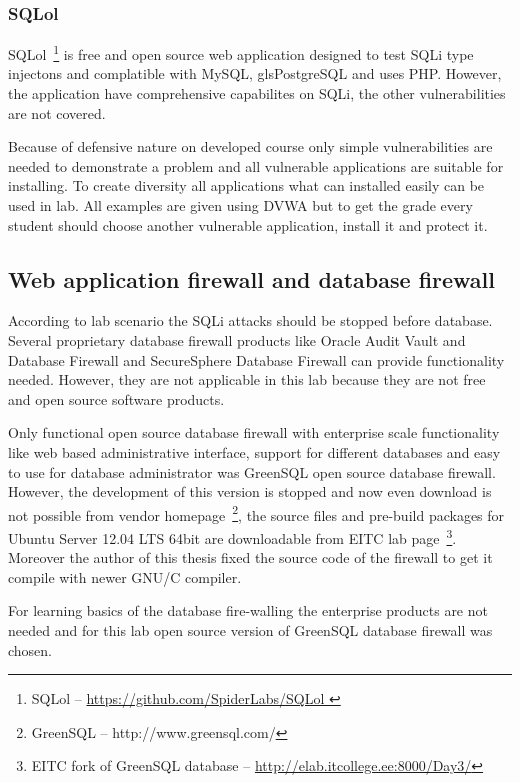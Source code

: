 \subsubsection{SQLol}
SQLol~\footnote{SQLol -- \url{https://github.com/SpiderLabs/SQLol
}} is free and open source web application designed to test \gls{SQLi} type injectons and complatible with \gls{MySQL}, gls{PostgreSQL} and uses \gls{PHP}. However, the application have comprehensive capabilites on \gls{SQLi}, the other vulnerabilities are not covered.

Because of defensive nature on developed course only simple vulnerabilities are needed to demonstrate a problem and all vulnerable applications are suitable for installing. To create diversity all applications what can installed easily can be used in lab. All examples are given using \gls{DVWA} but to get the grade every student should choose another vulnerable application, install it and protect it.

\subsection{Web application firewall and database firewall}


According to lab scenario the \gls{SQLi} attacks should be stopped before database. Several proprietary database firewall products like Oracle Audit Vault and Database Firewall and SecureSphere Database Firewall can provide functionality needed. However, they are not applicable in this lab because they are not free and open source software products.

Only functional open source database firewall with enterprise scale functionality like web based administrative interface, support for different databases and easy to use for database administrator was GreenSQL open source database firewall. However, the development of this version is stopped and now even download is not possible from vendor homepage~\footnote{GreenSQL -- http://www.greensql.com/}, the source files and pre-build packages for Ubuntu Server 12.04 LTS 64bit are downloadable from \gls{EITC} lab page~\footnote{\gls{EITC} fork of GreenSQL database -- \url{http://elab.itcollege.ee:8000/Day3/}}. Moreover the author of this thesis fixed the source code of the firewall to get it compile with newer GNU/C compiler.

For learning basics of the database fire-walling the enterprise products are not needed and for this lab open source version of GreenSQL database firewall was chosen.

